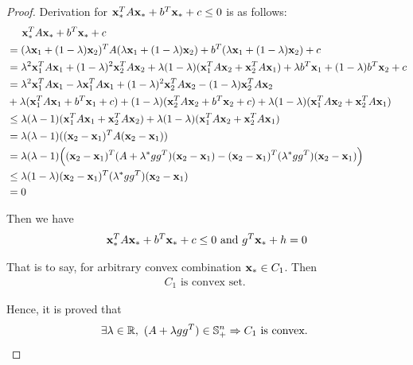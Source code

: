 \documentclass[11pt,a4paper]{article}
\begin{document}
\begin{proof}
    Derivation for $\mathbf{x}_{*}^{T} A \mathbf{x}_{*} + b^T \mathbf{x}_{*} + c \leq 0$ is as follows:
    \begin{align}
        & \hspace{0.5cm} \mathbf{x}_{*}^{T} A \mathbf{x}_{*} + b^T \mathbf{x}_{*} + c  \\
        & = (\lambda \mathbf{x}_{1} + (1-\lambda) \mathbf{x}_{2})^{T} A (\lambda \mathbf{x}_{1} + (1-\lambda) \mathbf{x}_{2}) + b^T (\lambda \mathbf{x}_{1} + (1-\lambda) \mathbf{x}_{2}) + c \\
        & = \lambda^2 \mathbf{x}_{1}^{T} A \mathbf{x}_{1} + (1-\lambda)^2 \mathbf{x}_{2}^{T} A \mathbf{x}_{2} 
        + \lambda(1-\lambda) (\mathbf{x}_{1}^{T} A \mathbf{x}_{2} + \mathbf{x}_{2}^{T} A \mathbf{x}_{1})
        + \lambda b^T \mathbf{x}_{1} + (1-\lambda) b^T \mathbf{x}_{2} + c \\
        & = \lambda^2 \mathbf{x}_{1}^{T} A \mathbf{x}_{1} - \lambda \mathbf{x}_{1}^{T} A \mathbf{x}_{1} 
        + (1-\lambda)^2 \mathbf{x}_{2}^{T} A \mathbf{x}_{2} - (1-\lambda) \mathbf{x}_{2}^{T} A \mathbf{x}_{2}
        \nonumber \\
        & + \lambda(\mathbf{x}_{1}^{T} A \mathbf{x}_{1} + b^T \mathbf{x}_{1} + c) + (1-\lambda)(\mathbf{x}_{2}^{T} A \mathbf{x}_{2} + b^T \mathbf{x}_{2} + c) 
        + \lambda(1-\lambda) (\mathbf{x}_{1}^{T} A \mathbf{x}_{2} + \mathbf{x}_{2}^{T} A \mathbf{x}_{1}) \\
        & \leq \lambda (\lambda - 1) (\mathbf{x}_{1}^{T} A \mathbf{x}_{1} + \mathbf{x}_{2}^{T} A \mathbf{x}_{2}) 
        + \lambda(1-\lambda) (\mathbf{x}_{1}^{T} A \mathbf{x}_{2} + \mathbf{x}_{2}^{T} A \mathbf{x}_{1}) \\
        & = \lambda(\lambda - 1) ((\mathbf{x}_{2} - \mathbf{x}_{1})^{T} A (\mathbf{x}_{2} - \mathbf{x}_{1})) \\
        & = \lambda(\lambda - 1) \Big( (\mathbf{x}_{2} - \mathbf{x}_{1})^{T} (A + \lambda^{*} gg^T) (\mathbf{x}_{2} - \mathbf{x}_{1})
        - (\mathbf{x}_{2} - \mathbf{x}_{1})^{T} (\lambda^{*} gg^T) (\mathbf{x}_{2} - \mathbf{x}_{1}) \Big) \\
        & \leq \lambda(1 - \lambda) (\mathbf{x}_{2} - \mathbf{x}_{1})^{T} (\lambda^{*} gg^T) (\mathbf{x}_{2} - \mathbf{x}_{1})  \\
        & = 0
    \end{align}

    Then we have 
    \begin{align}
        \mathbf{x}_{*}^{T} A \mathbf{x}_{*} + b^T \mathbf{x}_{*} + c \leq 0 \text{ and } g^T \mathbf{x}_{*} + h = 0 
    \end{align}
    
    That is to say, for arbitrary convex combination $\mathbf{x}_{*} \in C_1$. Then 
    \begin{align}
        C_1 \text{ is convex set. }
    \end{align}

    Hence, it is proved that 
    \begin{align}
        \exists \lambda \in \mathbb{R},\ (A + \lambda gg^T) \in \mathbb{S}_{+}^{n} \Rightarrow C_1
        \text{ is convex. }
    \end{align}

\end{proof}
    

\newpage
\end{document}
